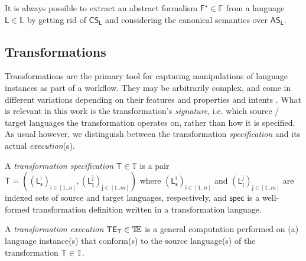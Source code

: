 It is always possible to extract an abstract formalism  
$\mathsf{F^\star}\in\mathbb{F}$ from a language $\mathsf{L}\in\mathbb{L}$ by 
getting rid of $\mathsf{CS}_{\mathsf{L}}$ and considering the canonical 
semantics over $\mathsf{AS}_{\mathsf{L}}$.




\subsection{Transformations}
\label{sec:Formalisation-Transformation}

Transformations are the primary tool for capturing manipulations of language 
instances as part of a workflow. They may be arbitrarily complex, and come in 
different variations depending on their features \cite{J:Mens-VonGorp:2006} and 
properties and intents \cite{J:Lucio-Amrani-etAl:2014}. What is relevant in 
this work is the transformation's \emph{signature}, i.e. which source / target 
languages the transformation operates on, rather than how it is specified. As 
usual however, we distinguish between the transformation \emph{specification} 
and its actual \emph{execution}(s).

\begin{Definition}
   A \emph{transformation specification} $\mathsf{T}\in\mathbb{T}$ is a pair
$\mathsf{T} = ((\mathsf{L_s^{i}})_{\mathsf{i}\in [1..n]}, 
(\mathsf{L_t^{j}})_{\mathsf{j}\in[1..m]})$ where  
$(\mathsf{L_s^{i}})_{\mathsf{i}\in [1..n]}$ and
$(\mathsf{L_t^{j}})_{\mathsf{j}\in [1..m]}$ are indexed sets of source and
target languages, respectively, and $\mathsf{spec}$ is a well-formed 
transformation definition written in a transformation language.

   A \emph{transformation execution} $\mathsf{TE_{T}}\in\mathbb{T}\!\mathbb{E}$ is a general 
computation performed on (a) language instance(s) that conform(s) to the source 
language(s) of the transformation $\mathsf{T}\in\mathbb{T}$.
\end{Definition}



